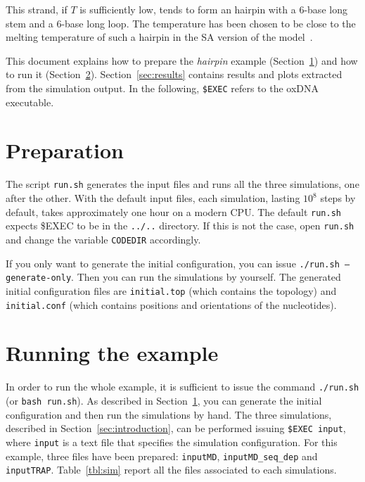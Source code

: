 \documentclass[superscriptaddress,prb]{revtex4-1}
\begin{document}
This strand, if $T$ is sufficiently low, tends to form an hairpin with a 6-base long stem and a 6-base long loop.
The temperature has been chosen to be close to the melting temperature of such a hairpin in the SA version of the  model~\cite{ouldridge_jcp}.

This document explains how to prepare the \textit{hairpin} example (Section~\ref{sec:setup}) and how to run it (Section~\ref{sec:run}). Section~\ref{sec:results} contains results and plots extracted from the simulation output. In the following, \texttt{\$EXEC} refers to the oxDNA executable.

\section{Preparation}
\label{sec:setup}

The script \texttt{run.sh} generates the input files and runs all the three simulations, one after the other. With the default input files, each simulation, lasting $10^8$ steps by default, takes approximately one hour on a modern CPU. The default \texttt{run.sh} expects \$EXEC to be in the \texttt{../..} directory. If this is not the case, open \texttt{run.sh} and change the variable \texttt{CODEDIR} accordingly.

If you only want to generate the initial configuration, you can issue \texttt{./run.sh --generate-only}. Then you can run the simulations by yourself. The generated initial configuration files are \texttt{initial.top} (which contains the topology) and \texttt{initial.conf} (which contains positions and orientations of the nucleotides).

\section{Running the example}
\label{sec:run}

In order to run the whole example, it is sufficient to issue the command \texttt{./run.sh} (or \texttt{bash run.sh}). As described in Section~\ref{sec:setup}, you can generate the initial configuration and then run the simulations by hand. The three simulations, described in Section~\ref{sec:introduction}, can be performed issuing \texttt{\$EXEC input}, where \texttt{input} is a text file that specifies the simulation configuration. For this example, three files have been prepared: \texttt{inputMD}, \texttt{inputMD\_seq\_dep} and \texttt{inputTRAP}. Table~\ref{tbl:sim} report all the files associated to each simulations.
\end{document}
